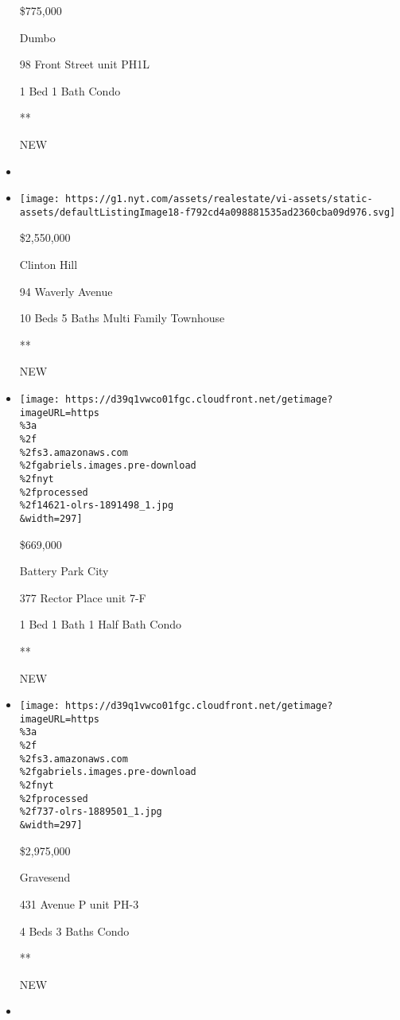\begin{itemize}
  \$775,000

  Dumbo

  98 Front Street unit PH1L

  1 Bed \textbar{} 1 Bath \textbar{} Condo

  **

  NEW
\item
\item
  \href{/real-estate/usa/ny/brooklyn/clinton-hill/homes-for-sale/94-waverly-avenue/12436-OLRS-0079241?}{}

  \texttt{[image: https://g1.nyt.com/assets/realestate/vi-assets/static-assets/defaultListingImage18-f792cd4a098881535ad2360cba09d976.svg]}

  \$2,550,000

  Clinton Hill

  94 Waverly Avenue

  10 Beds \textbar{} 5 Baths \textbar{} Multi Family Townhouse

  **

  NEW
\item
  \href{/real-estate/usa/ny/new-york/battery-park-city/homes-for-sale/377-rector-place/14621-OLRS-1891498?}{}

  \texttt{[image: https://d39q1vwco01fgc.cloudfront.net/getimage?imageURL=https\\\%3a\\\%2f\\\%2fs3.amazonaws.com\\\%2fgabriels.images.pre-download\\\%2fnyt\\\%2fprocessed\\\%2f14621-olrs-1891498\_1.jpg\\\&width=297]}

  \$669,000

  Battery Park City

  377 Rector Place unit 7-F

  1 Bed \textbar{} 1 Bath \textbar{} 1 Half Bath \textbar{} Condo

  **

  NEW
\item
  \href{/real-estate/usa/ny/brooklyn/gravesend/homes-for-sale/431-avenue-p/737-OLRS-1889501?}{}

  \texttt{[image: https://d39q1vwco01fgc.cloudfront.net/getimage?imageURL=https\\\%3a\\\%2f\\\%2fs3.amazonaws.com\\\%2fgabriels.images.pre-download\\\%2fnyt\\\%2fprocessed\\\%2f737-olrs-1889501\_1.jpg\\\&width=297]}

  \$2,975,000

  Gravesend

  431 Avenue P unit PH-3

  4 Beds \textbar{} 3 Baths \textbar{} Condo

  **

  NEW
\item
  \href{/real-estate/usa/ny/staten-island/st-george/homes-for-sale/90-bay-street-landing-staten-island-ny-10301/403-1139196?}{}


\end{itemize}
